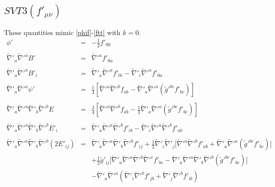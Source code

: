 \documentclass[10pt,letterpaper]{article}
\numberwithin{equation}{section}
\begin{document}
\subsection{$SVT3(f'_{\mu\nu})$}
These quantities mimic \eqref{phif}-\eqref{ftt} with $k=0$.
\begin{eqnarray}
\phi' &=& -\tfrac{1}{2} f'_{00}
\label{phifp}
\\ \nonumber\\
\tilde\nabla'_a\tilde\nabla'^a B' &=& \tilde\nabla'^a f'_{0a}
\\ \nonumber\\
\tilde\nabla'_a\tilde\nabla'^a B'_i &=& \tilde\nabla'_a\tilde\nabla'^a f'_{0i} -\tilde\nabla'_i \tilde\nabla'^a f'_{0a}
\\ \nonumber\\
\tilde\nabla'_a\tilde\nabla'^a\psi' &=& \frac{1}{4}\left[\tilde\nabla'^a\tilde\nabla'^b f_{ab}-\tilde\nabla'_a\tilde\nabla'^a (\tilde g'^{bc}f'_{bc})\right]
\\ \nonumber\\
\tilde\nabla'_a\tilde\nabla'^a\tilde\nabla'_b\tilde\nabla'^b E &=& \frac{3}{4}\left[ \tilde\nabla'^a\tilde\nabla'^b f_{ab} -\frac{1}{3}\tilde\nabla'_a\tilde\nabla'^a (\tilde g'^{bc}f'_{bc})\right]
\\ \nonumber\\
\tilde\nabla'_a\tilde\nabla'^a \tilde\nabla'_b\tilde\nabla'^b E'_i &=&
\tilde\nabla'_a\tilde\nabla'^a \tilde\nabla'^b f'_{ib} - \tilde\nabla'_i \tilde\nabla'^a\tilde\nabla'^b f'_{ab}
\\ \nonumber\\
\tilde\nabla'_a\tilde\nabla'^a\tilde\nabla'_b\tilde\nabla'^b (2E'_{ij})
&=& 
\tilde\nabla'_a\tilde\nabla'^a\tilde\nabla'_b\tilde\nabla'^bf'_{ij}
+ \tfrac12 \tilde\nabla'_i\tilde\nabla'_j\big[ \tilde\nabla'^a\tilde\nabla'^b f'_{ab} + \tilde\nabla'_a\tilde\nabla'^a (\tilde g'^{bc}f'_{bc})\big]
\nonumber\\
&&
+\tfrac12 \tilde g'_{ij} \big[ \tilde\nabla'_a\tilde\nabla'^a\tilde\nabla'^b\tilde\nabla'^c f'_{bc}-\tilde\nabla'_a\tilde\nabla'^a\tilde\nabla'_b\tilde\nabla'^b(\tilde g'^{bc}f'_{bc})\big]
\nonumber\\
&&
-\tilde\nabla'_a\tilde\nabla'^a (\tilde\nabla'_i\tilde\nabla'^b f'_{jb} + \tilde\nabla'_j \tilde\nabla'^b f'_{ib})
\label{fttp}
\end{eqnarray}

\end{document}
